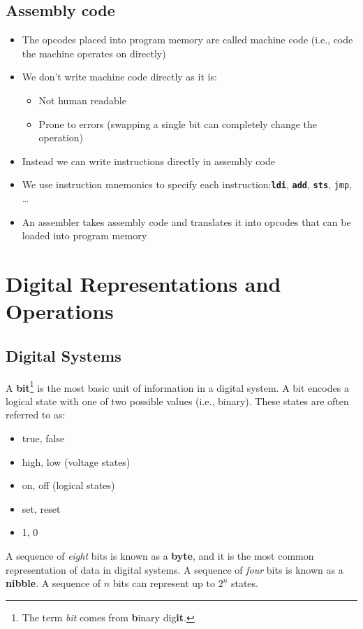 \documentclass{report}
\newcommand{\keywordinline}[1]{\textcolor[rgb]{0.00,0.50,0.00}{\textbf{\texttt{#1}}}}
\begin{document}
\section{Assembly code}
\begin{itemize}
    \item The opcodes placed into program memory are called
          machine code (i.e., code the machine operates on directly)
    \item We don't write machine code directly as it is:
          \begin{itemize}
              \item Not human readable
              \item Prone to errors (swapping a single bit can completely change the operation)
          \end{itemize}
    \item Instead we can write instructions directly in assembly code
    \item We use instruction mnemonics to specify each instruction:\@ \keywordinline{ldi}, \keywordinline{add}, \keywordinline{sts}, \texttt{jmp}, \dots
    \item An assembler takes assembly code and translates it into opcodes that can
          be loaded into program memory
\end{itemize}
\chapter{Digital Representations and Operations}
\section{Digital Systems}
A \textbf{bit}\footnote{The term \textit{bit} comes from \textbf{b}inary dig\textbf{it}.}
is the most basic unit of information in a digital system.
A bit encodes a logical state with one of two possible values (i.e., binary).
These states are often referred to as:
\begin{itemize}
    \item true, false
    \item high, low (voltage states)
    \item on, off (logical states)
    \item set, reset
    \item 1, 0
\end{itemize}
A sequence of \textit{eight} bits is known as a \textbf{byte}, and it is the most
common representation of data in digital systems.
A sequence of \textit{four} bits is known as a \textbf{nibble}.
A sequence of \(n\) bits can represent up to \(2^n\) states.
\end{document}
